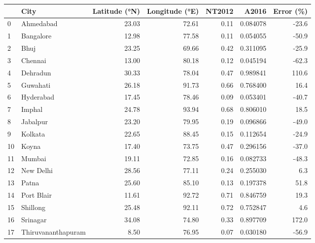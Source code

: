 \begin{tabular}{llrrrrr}
\toprule
{} &                City &  Latitude (°N) &  Longitude (°E) &  NT2012 &     A2016 &  Error (\%) \\
\midrule
0  &           Ahmedabad &          23.03 &           72.61 &    0.11 &  0.084078 &      -23.6 \\
1  &           Bangalore &          12.98 &           77.58 &    0.11 &  0.054055 &      -50.9 \\
2  &                Bhuj &          23.25 &           69.66 &    0.42 &  0.311095 &      -25.9 \\
3  &             Chennai &          13.00 &           80.18 &    0.12 &  0.045194 &      -62.3 \\
4  &            Dehradun &          30.33 &           78.04 &    0.47 &  0.989841 &      110.6 \\
5  &            Guwahati &          26.18 &           91.73 &    0.66 &  0.768400 &       16.4 \\
6  &           Hyderabad &          17.45 &           78.46 &    0.09 &  0.053401 &      -40.7 \\
7  &              Imphal &          24.78 &           93.94 &    0.68 &  0.806010 &       18.5 \\
8  &            Jabalpur &          23.20 &           79.95 &    0.19 &  0.096866 &      -49.0 \\
9  &             Kolkata &          22.65 &           88.45 &    0.15 &  0.112654 &      -24.9 \\
10 &               Koyna &          17.40 &           73.75 &    0.47 &  0.296156 &      -37.0 \\
11 &              Mumbai &          19.11 &           72.85 &    0.16 &  0.082733 &      -48.3 \\
12 &           New Delhi &          28.56 &           77.11 &    0.24 &  0.255030 &        6.3 \\
13 &               Patna &          25.60 &           85.10 &    0.13 &  0.197378 &       51.8 \\
14 &          Port Blair &          11.61 &           92.72 &    0.71 &  0.846759 &       19.3 \\
15 &            Shillong &          25.48 &           92.11 &    0.72 &  0.752847 &        4.6 \\
16 &            Srinagar &          34.08 &           74.80 &    0.33 &  0.897709 &      172.0 \\
17 &  Thiruvananthapuram &           8.50 &           76.95 &    0.07 &  0.030180 &      -56.9 \\
\bottomrule
\end{tabular}
